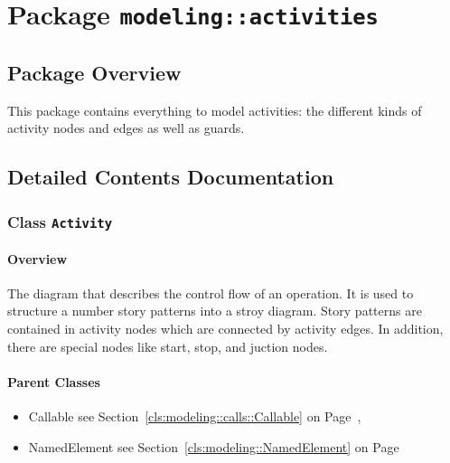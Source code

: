 \section{Package \bfseries \texttt{modeling::activities}\normalfont}
\subsection{Package Overview}
	
			
This package contains everything to model activities: the different kinds of activity nodes and edges as well as guards.	
		
	
			
		



\subsection{Detailed Contents Documentation}
\subsubsection{\Large{Class \bfseries \texttt{Activity}\normalfont}}
\label{cls:modeling::activities::Activity} 
\paragraph{Overview}

	
			
The diagram that describes the control flow of an operation. It is used to structure a number story patterns into a stroy diagram. Story patterns are contained in activity nodes which are connected by activity edges. In addition, there are special nodes like start, stop, and juction nodes.  	
		
	



\paragraph{Parent Classes}
\begin{itemize}
\item Callable see Section~\ref{cls:modeling::calls::Callable} on Page~\pageref{cls:modeling::calls::Callable}, \item NamedElement see Section~\ref{cls:modeling::NamedElement} on Page~\pageref{cls:modeling::NamedElement}\end{itemize}
